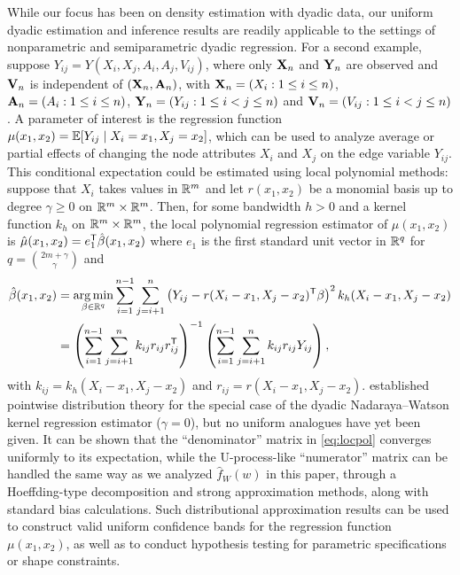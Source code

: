 While our focus has been on density estimation with dyadic data,
our uniform dyadic estimation and inference results are readily
applicable to the settings of nonparametric
and semiparametric dyadic regression.
For a second example, suppose $Y_{i j} = Y(X_i, X_j, A_i, A_j, V_{i j})$,
where only $\mathbf{X}_n$ and $\mathbf{Y}_n$ are observed and
$\mathbf{V}_n$ is independent of $(\mathbf{X}_n, \mathbf{A}_n)$,
with $\mathbf{X}_n = (X_i : 1 \leq i \leq n)$,
$\mathbf{A}_n = (A_i : 1 \leq i \leq n)$,
$\mathbf{Y}_n = (Y_{i j}:1\leq i<j\leq n)$
and $\mathbf{V}_n = (V_{i j} : 1 \leq i < j \leq n)$.
A parameter of interest is the regression function
$\mu(x_1, x_2) = \mathbb{E}[Y_{i j} \mid X_i=x_1, X_j=x_2]$,
which can be used to analyze average or partial effects
of changing the node attributes $X_i$ and $X_j$
on the edge variable $Y_{i j}$.
This conditional expectation could be estimated
using local polynomial methods:
suppose that $X_i$ takes values in $\mathbb{R}^m$ and
let $r(x_1, x_2)$ be a monomial basis up to degree
$\gamma \geq 0$ on $\mathbb{R}^m \times \mathbb{R}^m$. Then,
for some bandwidth $h > 0$ and
a kernel function $k_h$ on $\mathbb{R}^m \times \mathbb{R}^m$,
the local polynomial regression estimator of
$\mu(x_1, x_2)$ is
$\hat\mu(x_1, x_2)
= e_1^{\mathsf{T}} \hat\beta(x_1, x_2)$ where
$e_1$ is the first standard
unit vector in $\mathbb{R}^q$ for $q=\binom{2m+\gamma}{\gamma}$ and
\begin{align}
  \nonumber
  \hat{\beta}(x_1, x_2)
  &=
  \operatorname*{arg\,min}_{\beta \in \mathbb{R}^q}
  \sum_{i=1}^{n-1}
  \sum_{j=i+1}^n
  \left(
    Y_{i j} - r(X_i-x_1, X_j-x_2)^{\mathsf{T}} \beta
  \right)^2
  k_h(X_i-x_1, X_j-x_2) \\
  \label{eq:locpol}
  &=
  \left(
    \sum_{i=1}^{n-1}
    \sum_{j=i+1}^n
    k_{i j} r_{i j} r_{i j}^{\mathsf{T}}
  \right)^{-1}
  \left(
    \sum_{i=1}^{n-1}
    \sum_{j=i+1}^n
    k_{i j} r_{i j} Y_{i j}
  \right),
\end{align}
with $k_{i j} = k_h(X_i-x_1, X_j-x_2)$
and
$r_{i j} = r(X_i-x_1, X_j-x_2)$.
\citet{graham2021dyadicregression}
established pointwise distribution theory
for the special case of the dyadic Nadaraya--Watson
kernel regression estimator ($\gamma=0$), but no uniform analogues
have yet been given.
It can be shown that the
``denominator'' matrix
in \eqref{eq:locpol} converges uniformly
to its expectation,
while the U-process-like ``numerator'' matrix
can be handled the same way as we analyzed
$\hat f_W(w)$ in this paper,
through a Hoeffding-type decomposition and
strong approximation methods,
along with standard bias calculations.
Such distributional approximation results can be used to construct valid
uniform confidence bands for the regression
function $\mu(x_1, x_2)$,
as well as to conduct hypothesis testing for
parametric specifications or shape constraints.

